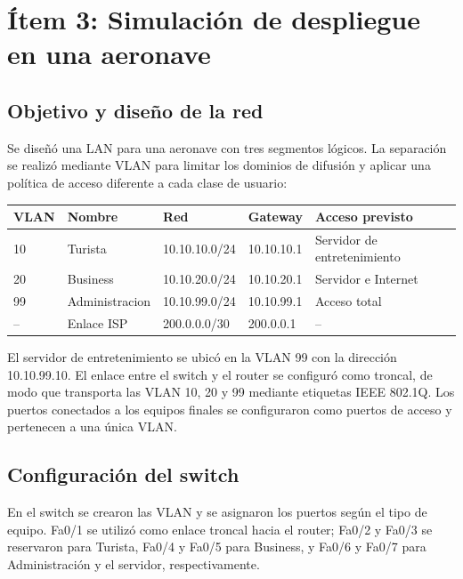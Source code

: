 \documentclass[12pt,a4paper]{article}
\let\oldsection\section
\renewcommand{\section}{\clearpage\oldsection}
\begin{document}
\section{Ítem 3: Simulación de despliegue en una aeronave}

\subsection{Objetivo y diseño de la red}
Se diseñó una LAN para una aeronave con tres segmentos lógicos. La separación se realizó mediante VLAN para limitar los dominios de difusión y aplicar una política de acceso diferente a cada clase de usuario:

\begin{center}
\small
\begin{tabular}{@{}lllll@{}}
\toprule
VLAN & Nombre & Red & Gateway & Acceso previsto \\
\midrule
10 & Turista & 10.10.10.0/24 & 10.10.10.1 & Servidor de entretenimiento \\
20 & Business & 10.10.20.0/24 & 10.10.20.1 & Servidor e Internet \\
99 & Administracion & 10.10.99.0/24 & 10.10.99.1 & Acceso total \\
-- & Enlace ISP & 200.0.0.0/30 & 200.0.0.1 & -- \\
\bottomrule
\end{tabular}
\end{center}

El servidor de entretenimiento se ubicó en la VLAN 99 con la dirección 10.10.99.10. El enlace entre el switch y el router se configuró como troncal, de modo que transporta las VLAN 10, 20 y 99 mediante etiquetas IEEE 802.1Q. Los puertos conectados a los equipos finales se configuraron como puertos de acceso y pertenecen a una única VLAN.


\subsection{Configuración del switch}
En el switch se crearon las VLAN y se asignaron los puertos según el tipo de equipo. Fa0/1 se utilizó como enlace troncal hacia el router; Fa0/2 y Fa0/3 se reservaron para Turista, Fa0/4 y Fa0/5 para Business, y Fa0/6 y Fa0/7 para Administración y el servidor, respectivamente.
\end{document}
